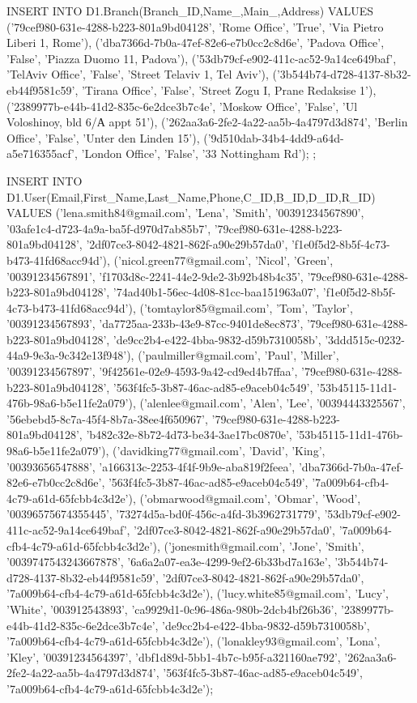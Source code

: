 INSERT INTO D1.Branch(Branch_ID,Name_,Main_,Address) VALUES
('79cef980-631e-4288-b223-801a9bd04128', 'Rome Office', 'True', 'Via Pietro Liberi 1, Rome'),
('dba7366d-7b0a-47ef-82e6-e7b0cc2c8d6e', 'Padova Office', 'False', 'Piazza Duomo 11, Padova'),
('53db79cf-e902-411c-ac52-9a14ce649baf', 'TelAviv Office', 'False', 'Street Telaviv 1, Tel Aviv'),
('3b544b74-d728-4137-8b32-eb44f9581c59', 'Tirana Office', 'False',  'Street Zogu I, Prane Redaksise 1'),
('2389977b-e44b-41d2-835c-6e2dce3b7c4e', 'Moskow Office', 'False', 'Ul Voloshinoy, bld 6/А appt 51'),
('262aa3a6-2fe2-4a22-aa5b-4a4797d3d874', 'Berlin Office', 'False', 'Unter den Linden 15'),
('9d510dab-34b4-4dd9-a64d-a5e716355acf', 'London Office', 'False', '33 Nottingham Rd');
;

INSERT INTO D1.User(Email,First_Name,Last_Name,Phone,C_ID,B_ID,D_ID,R_ID) VALUES
('lena.smith84@gmail.com', 'Lena', 'Smith',  '00391234567890', '03afe1c4-d723-4a9a-ba5f-d970d7ab85b7', '79cef980-631e-4288-b223-801a9bd04128', '2df07ce3-8042-4821-862f-a90e29b57da0',  'f1e0f5d2-8b5f-4c73-b473-41fd68acc94d'),
('nicol.green77@gmail.com', 'Nicol', 'Green',  '00391234567891', 'f1703d8c-2241-44e2-9de2-3b92b48b4c35', '79cef980-631e-4288-b223-801a9bd04128', '74ad40b1-56ec-4d08-81cc-baa151963a07', 'f1e0f5d2-8b5f-4c73-b473-41fd68acc94d'),
('tomtaylor85@gmail.com', 'Tom', 'Taylor',  '00391234567893', 'da7725aa-233b-43e9-87cc-9401de8ec873', '79cef980-631e-4288-b223-801a9bd04128', 'de9cc2b4-e422-4bba-9832-d59b7310058b', '3ddd515c-0232-44a9-9e3a-9c342e13f948'),
('paulmiller@gmail.com', 'Paul', 'Miller',  '00391234567897', '9f42561e-02e9-4593-9a42-cd9ed4b7ffaa', '79cef980-631e-4288-b223-801a9bd04128', '563f4fc5-3b87-46ac-ad85-e9aceb04c549', '53b45115-11d1-476b-98a6-b5e11fe2a079'),
('alenlee@gmail.com', 'Alen', 'Lee',  '00394443325567', '56ebebd5-8c7a-45f4-8b7a-38ee4f650967', '79cef980-631e-4288-b223-801a9bd04128', 'b482c32e-8b72-4d73-be34-3ae17bc0870e',  '53b45115-11d1-476b-98a6-b5e11fe2a079'),
('davidking77@gmail.com', 'David', 'King',  '00393656547888', 'a166313c-2253-4f4f-9b9e-aba819f2feea', 'dba7366d-7b0a-47ef-82e6-e7b0cc2c8d6e', '563f4fc5-3b87-46ac-ad85-e9aceb04c549', '7a009b64-cfb4-4c79-a61d-65fcbb4c3d2e'),
('obmarwood@gmail.com', 'Obmar', 'Wood',  '00396575674355445', '73274d5a-bd0f-456c-a4fd-3b3962731779', '53db79cf-e902-411c-ac52-9a14ce649baf', '2df07ce3-8042-4821-862f-a90e29b57da0', '7a009b64-cfb4-4c79-a61d-65fcbb4c3d2e'),
('jonesmith@gmail.com', 'Jone', 'Smith',  '0039747543243667878', '6a6a2a07-ea3e-4299-9ef2-6b33bd7a163e', '3b544b74-d728-4137-8b32-eb44f9581c59', '2df07ce3-8042-4821-862f-a90e29b57da0', '7a009b64-cfb4-4c79-a61d-65fcbb4c3d2e'),
('lucy.white85@gmail.com', 'Lucy', 'White',  '003912543893', 'ca9929d1-0c96-486a-980b-2dcb4bf26b36', '2389977b-e44b-41d2-835c-6e2dce3b7c4e', 'de9cc2b4-e422-4bba-9832-d59b7310058b', '7a009b64-cfb4-4c79-a61d-65fcbb4c3d2e'),
('lonakley93@gmail.com', 'Lona', 'Kley',  '00391234564397', 'dbf1d89d-5bb1-4b7c-b95f-a321160ae792', '262aa3a6-2fe2-4a22-aa5b-4a4797d3d874', '563f4fc5-3b87-46ac-ad85-e9aceb04c549', '7a009b64-cfb4-4c79-a61d-65fcbb4c3d2e');

